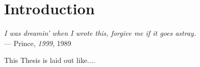 \chapter{Introduction}\label{ch:introduction} %

\begin{flushright}{\slshape    
    I was dreamin' when I wrote this, forgive me if it goes astray. } \\ \medskip
    --- {Prince, \textit{1999}, 1989}
\end{flushright}

This Thesis is laid out like.... 



